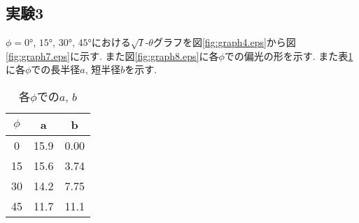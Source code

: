 \subsection{実験3}
$\phi=0\si{\degree}$, $15\si{\degree}$, $30\si{\degree}$, $45\si{\degree}$における$\sqrt{I}$-$\theta$グラフを図\ref{fig:graph4.eps}から図\ref{fig:graph7.eps}に示す.
また図\ref{fig:graph8.eps}に各$\phi$での偏光の形を示す.
また表\ref{tab:res3_ab}に各$\phi$での長半径$a$, 短半径$b$を示す.
\begin{table}[h]
   \caption{各$\phi$での$a$, $b$}
   \label{tab:res3_ab}
   \centering
   \begin{tabular}{ccc}
     \hline
     $\phi$&a&b\\
     \hline \hline
     0 & 15.9 & 0.00 \\
15 & 15.6 & 3.74 \\
30 & 14.2 & 7.75 \\
45 & 11.7 & 11.1 \\
     \hline
   \end{tabular}
\end{table}